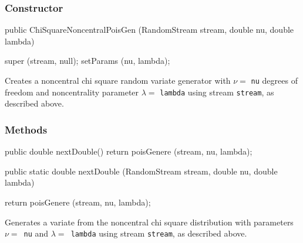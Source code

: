 \subsubsection* {Constructor}

\begin{code}

   public ChiSquareNoncentralPoisGen (RandomStream stream,
                                      double nu, double lambda) \begin{hide} {
      super (stream, null);
      setParams (nu, lambda);
   }\end{hide}
\end{code} 
\begin{tabb} Creates a noncentral chi square random variate generator 
with $\nu = $ \texttt{nu} degrees of freedom and noncentrality parameter
$\lambda = $ \texttt{lambda} using stream \texttt{stream}, as described above. 
\end{tabb}


\subsubsection* {Methods}
\begin{code}\begin{hide} 
  
   public double nextDouble() {
      return poisGenere (stream, nu, lambda);
   }\end{hide}

   public static double nextDouble (RandomStream stream,
                                    double nu, double lambda) \begin{hide} {
      return poisGenere (stream, nu, lambda);
   }\end{hide}
\end{code}
\begin{tabb}  Generates a variate from the noncentral chi square
   distribution with
   parameters $\nu = $~\texttt{nu} and $\lambda = $~\texttt{lambda} using
   stream \texttt{stream}, as described above.
\end{tabb}
\begin{code}\begin{hide}

//>>>>>>>>>>>>>>>>>>>>  P R I V A T E S    M E T H O D S   <<<<<<<<<<<<<<<<<<<< 

   private static double poisGenere (RandomStream s, double nu, double lambda) {
      int j = PoissonTIACGen.nextInt (s, 0.5*lambda);
      return GammaAcceptanceRejectionGen.nextDouble (s, 0.5*nu + j, 0.5);
   }

}\end{hide}
\end{code}
